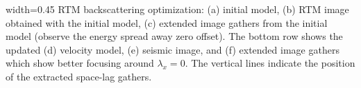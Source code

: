 
{width=0.45\textwidth}%
{RTM backscattering optimization: (a) initial model, (b) RTM image obtained with the initial model,
(c) extended image gathers from the initial model (observe the energy spread away zero offset). 
The bottom row shows the updated (d) velocity model, (e) seismic image, and (f) extended image gathers 
which show better focusing around $\lambda_x=0$. The vertical lines indicate the position of the 
extracted space-lag gathers.}


